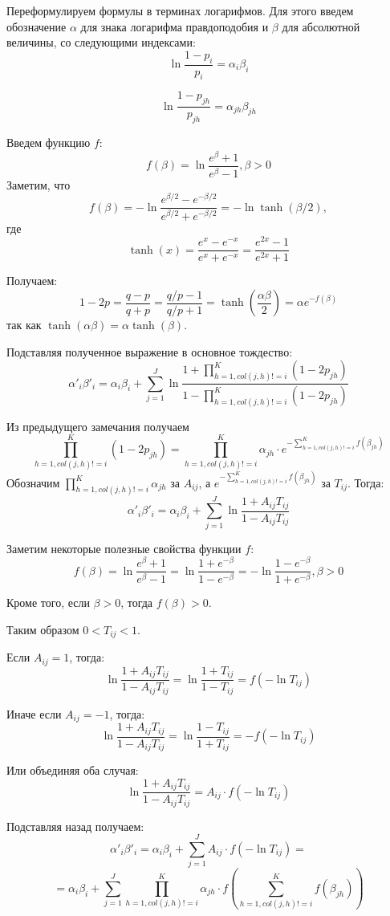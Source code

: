 Переформулируем формулы в терминах логарифмов. Для этого введем обозначение $\alpha$ для знака логарифма
правдоподобия и $\beta$ для абсолютной величины, со следующими индексами:
\[
	\ln \frac{1-p_i}{p_i	} = \alpha_i \beta_i
\]

\[
	\ln \frac{1-p_{jh}}{p_{jh}} = \alpha_{jh} \beta_{jh}
\]

Введем функцию $f$:
\[
	f(\beta)=\ln \frac{e^{\beta}+1}{e^{\beta}-1}, \beta>0
\]
Заметим, что
\[
	f(\beta)=- \ln \frac{e^{\beta/2}-e^{-\beta/2}}{e^{\beta/2}+e^{-\beta/2}}=-\ln \tanh(\beta/2),
\]
где
\[
	\tanh(x) = \frac{e^x-e^{-x}}{e^x+e^{-x}}=\frac{e^{2x}-1}{e^{2x}+1}
\]

Получаем:
\[
1-2p = \frac{q-p}{q+p} = \frac{q/p - 1}{q/p + 1} = \tanh \left( \frac{\alpha \beta}{2} \right)
= \alpha e^{-f(\beta)}
\]
так как $\tanh(\alpha \beta) = \alpha \tanh(\beta)$.

Подставляя полученное выражение в основное тождество:
\[
		\alpha'_i \beta'_i= \alpha_i \beta_i + \sum_{j=1}^J 
		\ln \frac{1+\prod_{h=1,col(j,h)!=i}^{K}(1-2p_{jh})}{1-\prod_{h=1,col(j,h)!=i}^{K}(1-2p_{jh})}
\]

Из предыдущего замечания получаем
\[
\prod_{h=1,col(j,h)!=i}^{K}(1-2p_{jh}) = \prod_{h=1,col(j,h)!=i}^{K} \alpha_{jh} \cdot 
 e^{-\sum_{h=1,col(j,h)!=i}^{K} f(\beta_{jh})}
\]
Обозначим $\prod_{h=1,col(j,h)!=i}^{K} \alpha_{jh}$ за $A_{ij}$, а 
$e^{-\sum_{h=1,col(j,h)!=i}^{K}f(\beta_{jh})}$ за $T_{ij}$. Тогда:
\[
		\alpha'_i \beta'_i= \alpha_i \beta_i + \sum_{j=1}^J 
		\ln \frac{1+A_{ij}T_{ij}}{1-A_{ij}T_{ij}}
\]

Заметим некоторые полезные свойства функции $f$:
\[
	f(\beta)=\ln \frac{e^{\beta}+1}{e^{\beta}-1}=\ln \frac{1+e^{-\beta}}{1-e^{-\beta}}
=-\ln \frac{1-e^{-\beta}}{1+e^{-\beta}}, \beta>0
\]

Кроме того, если $\beta>0$, тогда $f(\beta)>0$.

Таким образом $0 < T_{ij} < 1$.

Если $A_{ij}=1$, тогда:
\[
\ln \frac{1+A_{ij}T_{ij}}{1-A_{ij}T_{ij}}=\ln \frac{1+T_{ij}}{1-T_{ij}}=f(-\ln T_{ij})
\]

Иначе если  $A_{ij}=-1$, тогда:
\[
\ln \frac{1+A_{ij}T_{ij}}{1-A_{ij}T_{ij}}=\ln \frac{1-T_{ij}}{1+T_{ij}}=-f(-\ln T_{ij})
\]

Или объединяя оба случая:
\[
\ln \frac{1+A_{ij}T_{ij}}{1-A_{ij}T_{ij}}=A_{ij} \cdot f(-\ln T_{ij})
\]

Подставляя назад получаем:
\[
		\alpha'_i \beta'_i= \alpha_i \beta_i + \sum_{j=1}^J 
		A_{ij} \cdot f(-\ln T_{ij})=
\]
\[
=	\alpha_i \beta_i + \sum_{j=1}^J \prod_{h=1,col(j,h)!=i}^{K} \alpha_{jh} \cdot
		f(\sum_{h=1,col(j,h)!=i}^{K}f(\beta_{jh}))
\]

